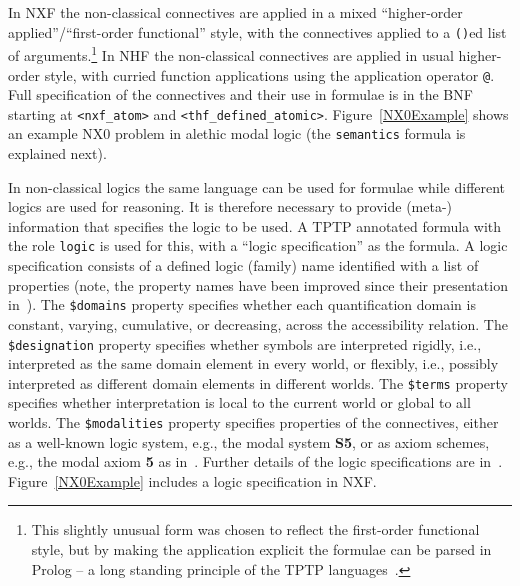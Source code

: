\documentclass{ceurart}
\begin{document}
In NXF the non-classical connectives are applied in a mixed 
``higher-order applied''/``first-order functional'' style, with the connectives applied to a
{\tt ()}ed list of arguments.\footnote{%
This slightly unusual form was chosen to reflect the first-order functional style, but by making
the application explicit the formulae can be parsed in Prolog -- a long standing principle of the
TPTP languages~\cite{SZS04}.}
In NHF the non-classical connectives are applied in usual higher-order style, with curried 
function applications using the application operator {\tt @}.
Full specification of the connectives and their use in formulae is in the 
BNF
starting at {\tt <nxf\_atom>} and {\tt <thf\_defined\_atomic>}.
Figure~\ref{NX0Example} shows an example NX0 problem in alethic modal logic (the {\tt semantics} 
formula is explained next).

In non-classical logics the same language can be used for formulae while different logics are 
used for reasoning.
It is therefore necessary to provide \mbox{(meta-)} information that specifies the
logic to be used.
A TPTP annotated formula with the role \texttt{logic} is used for this, with a ``logic 
specification'' as the formula.
A logic specification consists of a defined logic (family) name identified with a list of 
properties (note, the property names have been improved since their presentation in~\cite{SF+22}).
The {\tt \$domains} property specifies whether each quantification domain is constant, varying,
cumulative, or decreasing, across the accessibility relation.
The {\tt \$designation} property specifies whether symbols are interpreted rigidly, i.e., 
interpreted as the same domain element in every world, or flexibly, i.e., possibly interpreted 
as different domain elements in different worlds. 
The {\tt \$terms} property specifies whether interpretation is local to the current world or
global to all worlds.
The {\tt \$modalities} property specifies properties of the connectives, either as a well-known 
logic system, e.g., the modal system {\bf S5}, or as axiom schemes, e.g., the modal axiom {\bf 5} 
as in~\cite{Gar18}.
Further details of the logic specifications are in~\cite{SF+22}.
Figure~\ref{NX0Example} includes a logic specification in NXF.
\end{document}
